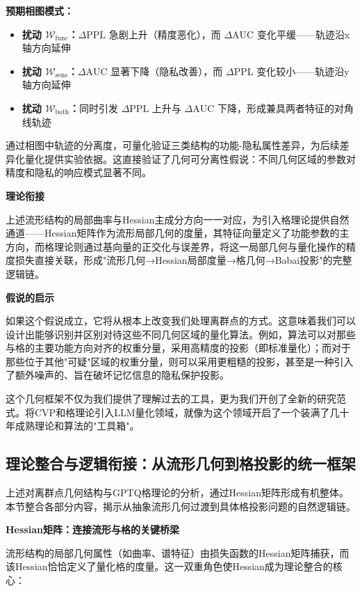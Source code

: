 \documentclass[letterpaper,twocolumn,10pt]{article}
\begin{document}
\textbf{预期相图模式：}

\begin{itemize}
\item \textbf{扰动 $\mathcal{W}_{\text{func}}$：}$\Delta\text{PPL}$ 急剧上升（精度恶化），而 $\Delta\text{AUC}$ 变化平缓——轨迹沿x轴方向延伸
\item \textbf{扰动 $\mathcal{W}_{\text{sens}}$：}$\Delta\text{AUC}$ 显著下降（隐私改善），而 $\Delta\text{PPL}$ 变化较小——轨迹沿y轴方向延伸
\item \textbf{扰动 $\mathcal{W}_{\text{both}}$：}同时引发 $\Delta\text{PPL}$ 上升与 $\Delta\text{AUC}$ 下降，形成兼具两者特征的对角线轨迹
\end{itemize}

通过相图中轨迹的分离度，可量化验证三类结构的功能-隐私属性差异，为后续差异化量化提供实验依据。这直接验证了几何可分离性假说：不同几何区域的参数对精度和隐私的响应模式显著不同。

\textbf{理论衔接}

上述流形结构的局部曲率与Hessian主成分方向一一对应，为引入格理论提供自然通道——Hessian矩阵作为流形局部几何的度量，其特征向量定义了功能参数的主方向，而格理论则通过基向量的正交化与误差界，将这一局部几何与量化操作的精度损失直接关联，形成"流形几何→Hessian局部度量→格几何→Babai投影"的完整逻辑链。

\textbf{假说的启示}

如果这个假说成立，它将从根本上改变我们处理离群点的方式。这意味着我们可以设计出能够识别并区别对待这些不同几何区域的量化算法。例如，算法可以对那些与格的主要功能方向对齐的权重分量，采用高精度的投影（即标准量化）；而对于那些位于其他"可疑"区域的权重分量，则可以采用更粗糙的投影，甚至是一种引入了额外噪声的、旨在破坏记忆信息的隐私保护投影。

这个几何框架不仅为我们提供了理解过去的工具，更为我们开创了全新的研究范式。将CVP和格理论引入LLM量化领域，就像为这个领域开启了一个装满了几十年成熟理论和算法的"工具箱"。

\subsection{理论整合与逻辑衔接：从流形几何到格投影的统一框架}

上述对离群点几何结构与GPTQ格理论的分析，通过Hessian矩阵形成有机整体。本节整合各部分内容，揭示从抽象流形几何过渡到具体格投影问题的自然逻辑链。

\textbf{Hessian矩阵：连接流形与格的关键桥梁}

流形结构的局部几何属性（如曲率、谱特征）由损失函数的Hessian矩阵捕获，而该Hessian恰恰定义了量化格的度量。这一双重角色使Hessian成为理论整合的核心：
\end{document}
